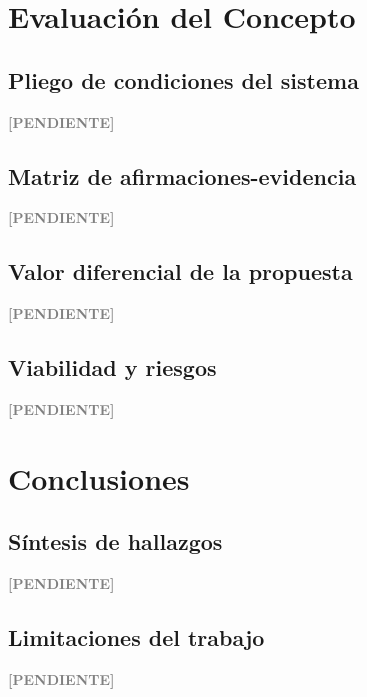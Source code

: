 \documentclass[12pt,a4paper]{article}
\newenvironment{pendiente}
  {\par\vspace{4pt}\noindent\textcolor{gray}{\textbf{[PENDIENTE]}}\par\begingroup\color{gray}\small}
  {\endgroup\par\vspace{4pt}}
\begin{document}
\section{Evaluación del Concepto}

\subsection{Pliego de condiciones del sistema}
\begin{pendiente}
\end{pendiente}

\subsection{Matriz de afirmaciones-evidencia}
\begin{pendiente}
\end{pendiente}

\subsection{Valor diferencial de la propuesta}
\begin{pendiente}
\end{pendiente}

\subsection{Viabilidad y riesgos}
\begin{pendiente}
\end{pendiente}



\section{Conclusiones}

\subsection{Síntesis de hallazgos}
\begin{pendiente}
\end{pendiente}

\subsection{Limitaciones del trabajo}
\begin{pendiente}
\end{pendiente}
\end{document}

